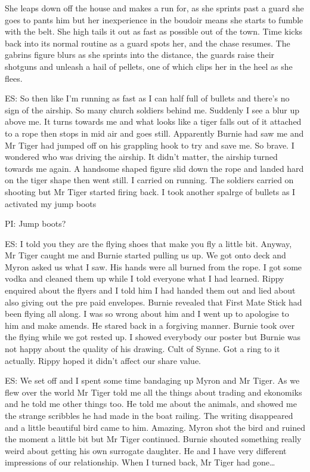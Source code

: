 She leaps down off the house and makes a run for, as she sprints past a guard she goes to pants him but her inexperience in the boudoir means she starts to fumble with the belt. She high tails it out as fast as possible out of the town. Time kicks back into its normal routine as a guard spots her, and the chase resumes. The gabrins figure blurs as she sprints into the distance, the guards raise their shotguns and unleash a hail of pellets, one of which clips her in the heel as she flees.\medskip

ES: So then like I’m running as fast as I can half full of bullets and there’s no sign of the airship. So many church soldiers behind me. Suddenly I see a blur up above me. It turns towards me and what looks like a tiger falls out of it attached to a rope then stops in mid air and goes still. Apparently Burnie had saw me and Mr Tiger had jumped off on his grappling hook to try and save me. So brave. I wondered who was driving the airship. It didn’t matter, the airship turned towards me again. A handsome shaped figure slid down the rope and landed hard on the tiger shape then went still. I carried on running. The soldiers carried on shooting but Mr Tiger started firing back. I took another spalrge of bullets as I activated my jump boots\medskip

PI: Jump boots?\medskip

ES: I told you they are the flying shoes that make you fly a little bit. Anyway, Mr Tiger caught me and Burnie started pulling us up. We got onto deck and Myron asked us what I saw. His hands were all burned from the rope. I got some vodka and cleaned them up while I told everyone what I had learned. Rippy enquired about the flyers and I told him I had handed them out and lied about also giving out the pre paid envelopes. Burnie revealed that First Mate Stick had been flying all along. I was so wrong about him and I went up to apologise to him and make amends. He stared back in a forgiving manner. Burnie took over the flying while we got rested up. I showed everybody our poster but Burnie was not happy about the quality of his drawing. Cult of Synne. Got a ring to it actually. Rippy hoped it didn’t affect our share value.\medskip

ES: We set off and I spent some time bandaging up Myron and Mr Tiger. As we flew over the world Mr Tiger told me all the things about trading and ekonomiks and he told me other things too. He told me about the animals, and showed me the strange scribbles he had made in the boat railing. The writing disappeared and a little beautiful bird came to him. Amazing. Myron shot the bird and ruined the moment a little bit but Mr Tiger continued. Burnie shouted something really weird about getting his own surrogate daughter. He and I have very different impressions of our relationship. When I turned back, Mr Tiger had gone…\medskip

